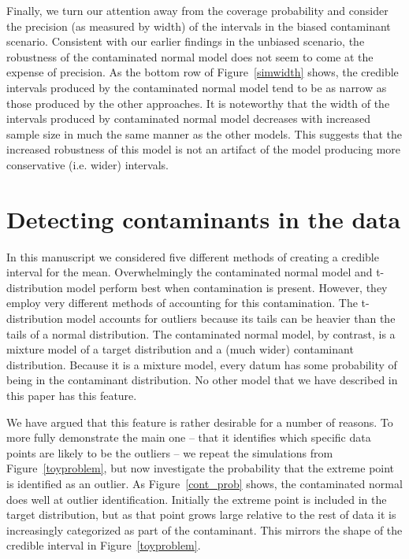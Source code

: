 \documentclass[doc]{apa6}
\begin{document}
{Finally, we turn our attention away from the coverage probability and consider the precision (as measured by width) of the intervals in the biased contaminant scenario.     Consistent   with our earlier findings in the unbiased scenario, the robustness of the contaminated normal model does not seem to come at the expense of precision. As the bottom row of Figure~\ref{simwidth} shows, the credible intervals produced by the contaminated normal model tend to be as narrow as those produced by the other approaches. It is noteworthy that the width of the intervals produced by contaminated normal model decreases with increased sample size in much the same manner as the other models. This suggests that the increased robustness of this model is not an artifact of the model producing more conservative (i.e. wider) intervals.


\section{  Detecting contaminants in the data}

In this manuscript we considered five different methods of creating a credible interval for the mean. Overwhelmingly the contaminated normal model and t-distribution model perform best when contamination is present. However, they employ very different methods of accounting for this contamination. The t-distribution model accounts for outliers because its tails can be heavier than the tails of a normal distribution. The contaminated normal model, by contrast, is a mixture model of a target distribution and a (much wider) contaminant distribution. Because it is a mixture model, every datum has some probability of being in the contaminant distribution. No other model that we have described in this paper has this feature.

We have argued that this feature is rather desirable for a number of reasons. To more fully demonstrate the main one -- that it identifies which specific data points are likely to be the outliers -- we repeat the simulations from Figure~\ref{toyproblem}, but now investigate the probability that the extreme point is identified as an outlier. As Figure~\ref{cont_prob} shows, the contaminated normal does well at outlier identification. Initially the extreme point is included in the target distribution, but as that point grows large relative to the rest of data it is increasingly categorized as part of the contaminant. This mirrors the shape of the credible interval in Figure~\ref{toyproblem}.

}
\end{document}
